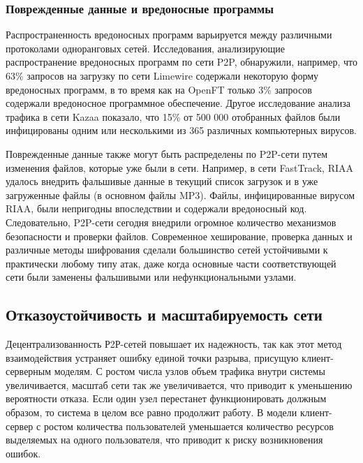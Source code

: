 \documentclass[bachelor, och, coursework]{SCWorks}
\begin{document}
\subsubsection{Поврежденные данные и вредоносные программы}
Распространенность вредоносных программ варьируется между различными протоколами одноранговых сетей. 
Исследования, анализирующие распространение вредоносных программ по сети P2P, обнаружили, например, что 63\% запросов на загрузку по сети Limewire содержали некоторую форму вредоносных программ, в то время как на OpenFT только 3\% запросов содержали вредоносное программное обеспечение. Другое исследование анализа трафика в сети Kazaa показало, что 15\% от 500 000 отобранных файлов были инфицированы одним или несколькими из 365 различных компьютерных вирусов.

Поврежденные данные также могут быть распределены по P2P-сети путем изменения файлов, которые уже были в сети. 
Например, в сети FastTrack, RIAA удалось внедрить фальшивые данные в текущий список загрузок и в уже загруженные файлы (в основном файлы MP3). 
Файлы, инфицированные вирусом RIAA, были непригодны впоследствии и содержали вредоносный код. 
Следовательно, P2P-сети сегодня внедрили огромное количество механизмов безопасности и проверки файлов. 
Современное хеширование, проверка данных и различные методы шифрования сделали большинство сетей устойчивыми к 
практически любому типу атак, даже когда основные части соответствующей сети были заменены фальшивыми или нефункциональными узлами.

\subsection{Отказоустойчивость и масштабируемость сети}
Децентрализованность Р2Р-сетей повышает их надежность, так как этот метод взаимодействия устраняет ошибку единой точки разрыва, присущую клиент-серверным моделям. С ростом числа узлов объем трафика внутри системы увеличивается, масштаб сети так же увеличивается, что приводит к уменьшению вероятности отказа. Если один узел перестанет функционировать должным образом, то система в целом все равно продолжит работу. 
В модели клиент-сервер с ростом количества пользователей уменьшается количество ресурсов выделяемых на одного пользователя, что приводит к риску возникновения ошибок.
\end{document}
